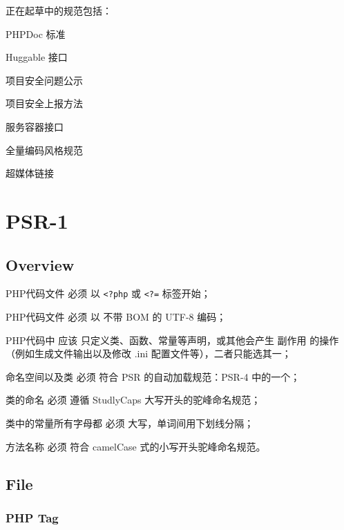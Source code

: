 正在起草中的规范包括：

\begin{compactitem}
\item PHPDoc 标准
\item Huggable 接口
\item 项目安全问题公示
\item 项目安全上报方法
\item 服务容器接口
\item 全量编码风格规范
\item 超媒体链接
\end{compactitem}


\chapter{PSR-1}


\section{Overview}

\begin{compactitem}
\item PHP代码文件 必须 以 \texttt{<?php} 或 \texttt{<?=} 标签开始；

\item PHP代码文件 必须 以 不带 BOM 的 UTF-8 编码；

\item PHP代码中 应该 只定义类、函数、常量等声明，或其他会产生 副作用 的操作（例如生成文件输出以及修改 .ini 配置文件等），二者只能选其一；

\item 命名空间以及类 必须 符合 PSR 的自动加载规范：PSR-4 中的一个；

\item 类的命名 必须 遵循 StudlyCaps 大写开头的驼峰命名规范；

\item 类中的常量所有字母都 必须 大写，单词间用下划线分隔；

\item 方法名称 必须 符合 camelCase 式的小写开头驼峰命名规范。

\end{compactitem}

\section{File}

\subsection{PHP Tag}


